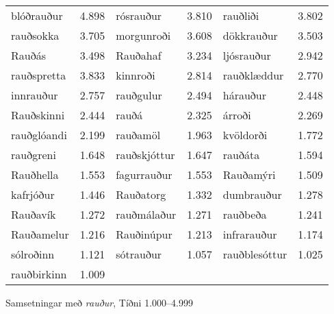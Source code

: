 \documentclass[../samsetningasafn.tex]{subfiles}
\begin{document}
\begin{wordlist}[H]
\begin{tcolorbox}

	\setlength{\extrarowheight}{3pt}
	\begin{tabular}{BlBlBl}
		blóðrauður		& 4.898		& 	
		rósrauður		& 3.810		& 	
		rauðliði			& 3.802		\\ 	
		rauðsokka		& 3.705		& 
		morgunroði		& 3.608		& 
		dökkrauður		& 3.503		\\ 		
		Rauðás			& 3.498		& 	
		Rauðahaf		& 3.234		& 	
		ljósrauður		& 2.942		\\ 
		rauðspretta		& 3.833		& 	
		kinnroði			& 2.814		& 
		rauðklæddur		& 2.770		\\ 	
		innrauður		& 2.757		& 	
		rauðgulur		& 2.494		& 	
		hárauður		& 2.448		\\ 
		Rauðskinni		& 2.444		& 		
		rauðá			& 2.325		& 	
		árroði			& 2.269		\\ 	
		rauðglóandi		& 2.199		& 	
		rauðamöl		& 1.963		& 	
		kvöldorði		& 1.772		\\ 
		rauðgreni		& 1.648		& 	
		rauðskjóttur		& 1.647		& 	
		rauðáta			& 1.594		\\ 
		Rauðhella		& 1.553		& 	
		fagurrauður		& 1.553		& 		
		Rauðamýri		& 1.509		\\ 	
		kafrjóður		& 1.446		& 	
		Rauðatorg		& 1.332		& 	
		dumbrauður		& 1.278		\\ 
		Rauðavík		& 1.272		& 
		rauðmálaður		& 1.271		& 	
		rauðbeða		& 1.241		\\ 
		Rauðamelur		& 1.216		& 	
		Rauðinúpur		& 1.213		& 	
		infrarauður		& 1.174		\\ 	
		sólroðinn		& 1.121		& 	
		sótrauður		& 1.057		& 
		rauðblesóttur		& 1.025		\\ 	
		rauðbirkinn		& 1.009		& 	
						&			&
						&
	\end{tabular}
	
\end{tcolorbox}
	\caption{Samsetningar með \textit{rauður}, Tíðni 1.000--4.999}
	\label{listi:rautt.1000}
\end{wordlist}
\end{document}
